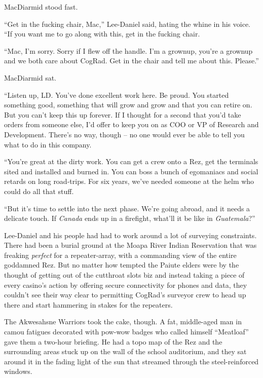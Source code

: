 MacDiarmid stood fast.

“Get in the fucking chair, Mac,” Lee-Daniel said, hating the whine 
in his voice. “If you want me to go along with this, get in the 
fucking chair.

“Mac, I'm sorry. Sorry if I flew off the handle. I'm a grownup, 
you're a grownup and we both care about CogRad. Get in the chair and 
tell me about this. Please.”

MacDiarmid sat.

“Listen up, LD. You've done excellent work here. Be proud. You 
started something good, something that will grow and grow and that you 
can retire on. But you can't keep this up forever. If I thought for a 
second that you'd take orders from someone else, I'd offer to keep you 
on as COO or VP of Research and Development. There's no way, though -- 
no one would ever be able to tell you what to do in this company.

“You're great at the dirty work. You can get a crew onto a Rez, get 
the terminals sited and installed and burned in. You can boss a bunch 
of egomaniacs and social retards on long road-trips. For six years, 
we've needed someone at the helm who could do all that stuff.

“But it's time to settle into the next phase. We're going abroad, and 
it needs a delicate touch. If \emph{Canada} ends up in a firefight, 
what'll it be like in \emph{Guatemala}?”

\tb

Lee-Daniel and his people had had to work around a lot of surveying 
constraints. There had been a burial ground at the Moapa River Indian 
Reservation that was freaking \emph{perfect} for a repeater-array, with 
a commanding view of the entire goddamned Rez. But no matter how 
tempted the Paiute elders were by the thought of getting out of the 
cutthroat slots biz and instead taking a piece of every casino's action 
by offering secure connectivity for phones and data, they couldn't see 
their way clear to permitting CogRad's surveyor crew to head up there 
and start hammering in stakes for the repeaters.

The Akwesahsne Warriors took the cake, though. A fat, middle-aged man 
in camou fatigues decorated with pow-wow badges who called himself 
“Meatloaf” gave them a two-hour briefing. He had a topo map of the 
Rez and the surrounding areas stuck up on the wall of the school 
auditorium, and they sat around it in the fading light of the sun that 
streamed through the steel-reinforced windows.

